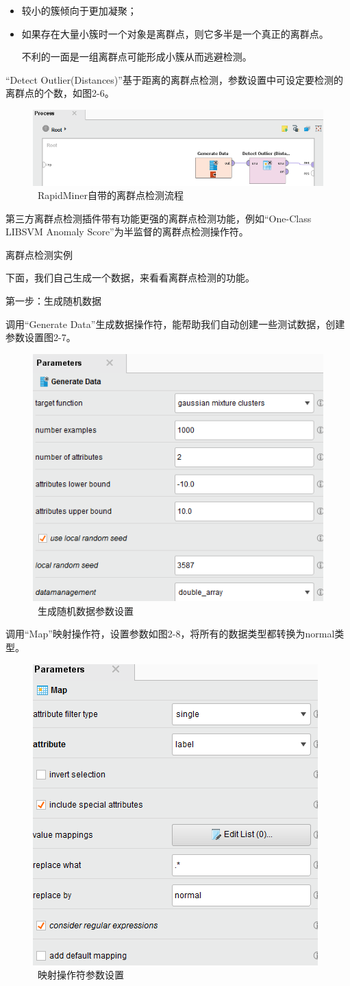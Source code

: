 \begin{itemize}[leftmargin=1cm]

\item 较小的簇倾向于更加凝聚；

\item 如果存在大量小簇时一个对象是离群点，则它多半是一个真正的离群点。

不利的一面是一组离群点可能形成小簇从而逃避检测。
\end{itemize}



“Detect Outlier(Distances)”基于距离的离群点检测，参数设置中可设定要检测的离群点的个数，如图2-6。

\begin{figure}[thbp!]
\centering
\includegraphics[width=0.4\linewidth]{figure/2-9}
\caption{\  RapidMiner自带的离群点检测流程}
\label{fig:2-9}
\end{figure}


第三方离群点检测插件带有功能更强的离群点检测功能，例如“One-Class LIBSVM Anomaly Score”为半监督的离群点检测操作符。

 离群点检测实例

下面，我们自己生成一个数据，来看看离群点检测的功能。

第一步：生成随机数据

调用“Generate Data”生成数据操作符，能帮助我们自动创建一些测试数据，创建参数设置图2-7。

\begin{figure}[thbp!]
\centering
\includegraphics[width=0.4\linewidth]{figure/2-10}
\caption{\ 生成随机数据参数设置}
\label{fig:2-10}
\end{figure}


调用“Map”映射操作符，设置参数如图2-8，将所有的数据类型都转换为normal类型。

\begin{figure}[thbp!]
\centering
\includegraphics[width=0.4\linewidth]{figure/2-11}
\caption{\  映射操作符参数设置}
\label{fig:2-11}
\end{figure}


